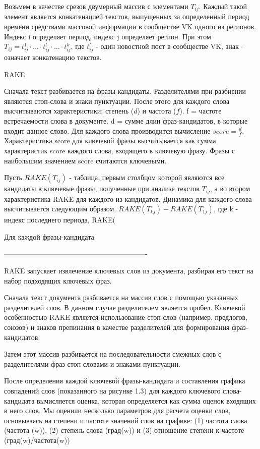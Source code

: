 \documentclass[bachelor, och, diploma ]{SCWorks}
\begin{document}
Возьмем в качестве срезов двумерный массив с элементами $T_{ij}$. Каждый такой элемент является конкатенацией текстов, выпущенных за определенный период времени средствами массовой информации в сообществе VK одного из регионов. Индекс i определяет период, индекс j определяет регион. При этом $T_{ij} = t_{ij}^1 \cdot \dotsc \cdot t_{ij}^l \cdot \dotsc \cdot t_{ij}^k$, где $t_{ij}^l$ - один новостной пост в сообществе VK, знак $\cdot$ означает конкатенацию текстов.

RAKE 

Сначала текст разбивается на фразы-кандидаты. Разделителями при разбиении являются стоп-слова и знаки пунктуации. После этого для каждого слова высчитываются характеристики: степень ($d$) и частота ($f$). f = частоте встречаемости слова в документе. d = сумме длин фраз-кандидатов, в которые входит данное слово. Для каждого слова производится вычисление $score = \frac{d}{f}$. Характеристика score для ключевой фразы высчитывается как сумма характеристик score каждого слова, входящего в ключевую фразу. Фразы с наибольшим значением score считаются ключевыми.

Пусть $RAKE(T_{ij})$ - таблица, первым столбцом которой являются все кандидаты в ключевые фразы, полученные при анализе текстов $T_{ij}$, а во втором характеристика RAKE для каждого из кандидатов. 
Динамика для каждого слова высчитывается следующим образом. $RAKE(T_{kj}) - RAKE(T_{1j})$, где k - индекс последнего периода, RAKE(

Для каждой фразы-кандидата 


-------------------------------------------------------------


RAKE запускает извлечение ключевых слов из документа, разбирая его текст на набор подходящих ключевых фраз. 

Сначала текст документа разбивается на массив слов с помощью указанных разделителей слов. В данном случае разделителем является пробел. Ключевой особенностью RAKE является использование стоп-слов (например, предлогов, союзов) и знаков препинания в качестве разделителей для формирования фраз-кандидатов.

Затем этот массив разбивается на последовательности смежных слов с разделителями фраз стоп-словами и знаками пунктуации. 

После определения каждой ключевой фразы-кандидата и составления графика совпадений слов (показанного на рисунке 1.3) для каждого ключевого слова-кандидата вычисляется оценка, которая определяется как сумма оценок входящих в него слов. Мы оценили несколько параметров для расчета оценки слов, основываясь на степени и частоте значений слов на графике: (1) частота слова (частота (w)), (2) степень слова (град(w)) и (3) отношение степени к частоте (град(w)/частота(w)) 
\end{document}
